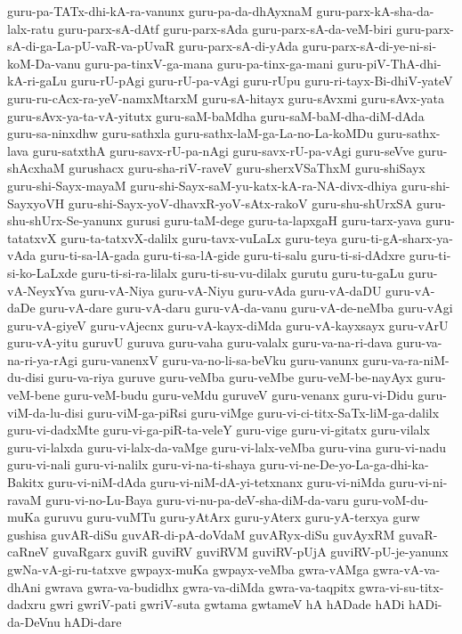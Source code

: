 {guru-pa-TATx-dhi-kA-ra-vanunx
guru-pa-da-dhAyxnaM
guru-parx-kA-sha-da-lalx-ratu
guru-parx-sA-dAtf
guru-parx-sAda
guru-parx-sA-da-veM-biri
guru-parx-sA-di-ga-La-pU-vaR-va-pUvaR
guru-parx-sA-di-yAda
guru-parx-sA-di-ye-ni-si-koM-Da-vanu
guru-pa-tinxV-ga-mana
guru-pa-tinx-ga-mani
guru-piV-ThA-dhi-kA-ri-gaLu
guru-rU-pAgi
guru-rU-pa-vAgi
guru-rUpu
guru-ri-tayx-Bi-dhiV-yateV
guru-ru-cAcx-ra-yeV-namxMtarxM
guru-sA-hitayx
guru-sAvxmi
guru-sAvx-yata
guru-sAvx-ya-ta-vA-yitutx
guru-saM-baMdha
guru-saM-baM-dha-diM-dAda
guru-sa-ninxdhw
guru-sathxla
guru-sathx-laM-ga-La-no-La-koMDu
guru-sathx-lava
guru-satxthA
guru-savx-rU-pa-nAgi
guru-savx-rU-pa-vAgi
guru-seVve
guru-shAcxhaM
gurushacx
guru-sha-riV-raveV
guru-sherxVSaThxM
guru-shiSayx
guru-shi-Sayx-mayaM
guru-shi-Sayx-saM-yu-katx-kA-ra-NA-divx-dhiya
guru-shi-SayxyoVH
guru-shi-Sayx-yoV-dhavxR-yoV-sAtx-rakoV
guru-shu-shUrxSA
guru-shu-shUrx-Se-yanunx
gurusi
guru-taM-dege
guru-ta-lapxgaH
guru-tarx-yava
guru-tatatxvX
guru-ta-tatxvX-dalilx
guru-tavx-vuLaLx
guru-teya
guru-ti-gA-sharx-ya-vAda
guru-ti-sa-lA-gada
guru-ti-sa-lA-gide
guru-ti-salu
guru-ti-si-dAdxre
guru-ti-si-ko-LaLxde
guru-ti-si-ra-lilalx
guru-ti-su-vu-dilalx
gurutu
guru-tu-gaLu
guru-vA-NeyxYva
guru-vA-Niya
guru-vA-Niyu
guru-vAda
guru-vA-daDU
guru-vA-daDe
guru-vA-dare
guru-vA-daru
guru-vA-da-vanu
guru-vA-de-neMba
guru-vAgi
guru-vA-giyeV
guru-vAjecnx
guru-vA-kayx-diMda
guru-vA-kayxsayx
guru-vArU
guru-vA-yitu
guruvU
guruva
guru-vaha
guru-valalx
guru-va-na-ri-dava
guru-va-na-ri-ya-rAgi
guru-vanenxV
guru-va-no-li-sa-beVku
guru-vanunx
guru-va-ra-niM-du-disi
guru-va-riya
guruve
guru-veMba
guru-veMbe
guru-veM-be-nayAyx
guru-veM-bene
guru-veM-budu
guru-veMdu
guruveV
guru-venanx
guru-vi-Didu
guru-viM-da-lu-disi
guru-viM-ga-piRsi
guru-viMge
guru-vi-ci-titx-SaTx-liM-ga-dalilx
guru-vi-dadxMte
guru-vi-ga-piR-ta-veleY
guru-vige
guru-vi-gitatx
guru-vilalx
guru-vi-lalxda
guru-vi-lalx-da-vaMge
guru-vi-lalx-veMba
guru-vina
guru-vi-nadu
guru-vi-nali
guru-vi-nalilx
guru-vi-na-ti-shaya
guru-vi-ne-De-yo-La-ga-dhi-ka-Bakitx
guru-vi-niM-dAda
guru-vi-niM-dA-yi-tetxnanx
guru-vi-niMda
guru-vi-ni-ravaM
guru-vi-no-Lu-Baya
guru-vi-nu-pa-deV-sha-diM-da-varu
guru-voM-du-muKa
guruvu
guru-vuMTu
guru-yAtArx
guru-yAterx
guru-yA-terxya
gurw
gushisa
guvAR-diSu
guvAR-di-pA-doVdaM
guvARyx-diSu
guvAyxRM
guvaR-caRneV
guvaRgarx
guviR
guviRV
guviRVM
guviRV-pUjA
guviRV-pU-je-yanunx
gwNa-vA-gi-ru-tatxve
gwpayx-muKa
gwpayx-veMba
gwra-vAMga
gwra-vA-va-dhAni
gwrava
gwra-va-budidhx
gwra-va-diMda
gwra-va-taqpitx
gwra-vi-su-titx-dadxru
gwri
gwriV-pati
gwriV-suta
gwtama
gwtameV
hA
hADade
hADi
hADi-da-DeVnu
hADi-dare
}
